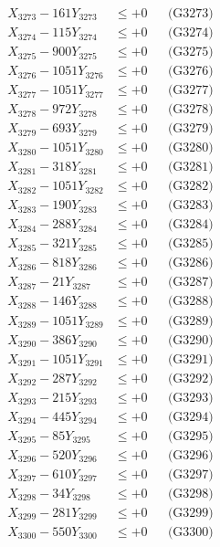 \documentclass[a4paper,10pt]{article}
\begin{document}
{\begin{align}
X_{3273} - 161Y_{3273} &\leq +0 && \text{(G3273)} \\
X_{3274} - 115Y_{3274} &\leq +0 && \text{(G3274)} \\
X_{3275} - 900Y_{3275} &\leq +0 && \text{(G3275)} \\
X_{3276} - 1051Y_{3276} &\leq +0 && \text{(G3276)} \\
X_{3277} - 1051Y_{3277} &\leq +0 && \text{(G3277)} \\
X_{3278} - 972Y_{3278} &\leq +0 && \text{(G3278)} \\
X_{3279} - 693Y_{3279} &\leq +0 && \text{(G3279)} \\
X_{3280} - 1051Y_{3280} &\leq +0 && \text{(G3280)} \\
\allowbreak
X_{3281} - 318Y_{3281} &\leq +0 && \text{(G3281)} \\
X_{3282} - 1051Y_{3282} &\leq +0 && \text{(G3282)} \\
X_{3283} - 190Y_{3283} &\leq +0 && \text{(G3283)} \\
X_{3284} - 288Y_{3284} &\leq +0 && \text{(G3284)} \\
X_{3285} - 321Y_{3285} &\leq +0 && \text{(G3285)} \\
X_{3286} - 818Y_{3286} &\leq +0 && \text{(G3286)} \\
X_{3287} - 21Y_{3287} &\leq +0 && \text{(G3287)} \\
X_{3288} - 146Y_{3288} &\leq +0 && \text{(G3288)} \\
X_{3289} - 1051Y_{3289} &\leq +0 && \text{(G3289)} \\
X_{3290} - 386Y_{3290} &\leq +0 && \text{(G3290)} \\
\allowbreak
X_{3291} - 1051Y_{3291} &\leq +0 && \text{(G3291)} \\
X_{3292} - 287Y_{3292} &\leq +0 && \text{(G3292)} \\
X_{3293} - 215Y_{3293} &\leq +0 && \text{(G3293)} \\
X_{3294} - 445Y_{3294} &\leq +0 && \text{(G3294)} \\
X_{3295} - 85Y_{3295} &\leq +0 && \text{(G3295)} \\
X_{3296} - 520Y_{3296} &\leq +0 && \text{(G3296)} \\
X_{3297} - 610Y_{3297} &\leq +0 && \text{(G3297)} \\
X_{3298} - 34Y_{3298} &\leq +0 && \text{(G3298)} \\
X_{3299} - 281Y_{3299} &\leq +0 && \text{(G3299)} \\
X_{3300} - 550Y_{3300} &\leq +0 && \text{(G3300)} \\

\end{align}}
\end{document}
